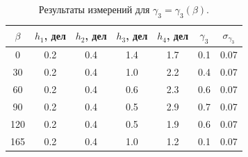 \documentclass[a4paper, 12pt]{article}%
\begin{document}
\begin{table}[h]
\begin{tabular}{|c|c|c|c|c|c|c|}
\hline
$\beta$ & $h_1$, дел & $h_2$, дел & $h_3$, дел & $h_4$, дел & $\gamma_3$ & $\sigma_{\gamma_3}$ \\ \hline
0        & 0.2        & 0.4        & 1.4        & 1.7        & 0.1       & 0.07      \\ \hline
30       & 0.2        & 0.4        & 1.0        & 2.2        & 0.4       & 0.07      \\ \hline
60       & 0.2        & 0.4        & 0.6        & 2.3        & 0.6       & 0.07      \\ \hline
90       & 0.2        & 0.4        & 0.5        & 2.9        & 0.7       & 0.07      \\ \hline
120      & 0.2        & 0.4        & 0.5        & 1.9        & 0.6       & 0.07      \\ \hline
165      & 0.2        & 0.4        & 1.0        & 1.2        & 0.1       & 0.07      \\ \hline
\end{tabular}
\centering
\caption{Результаты измерений для $\gamma_3 = \gamma_3(\beta)$.}
\end{table}
\end{document}
